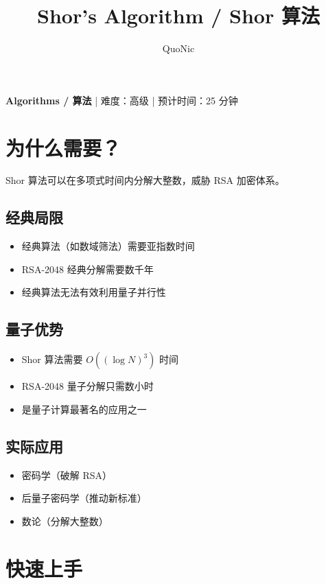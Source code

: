 \documentclass[12pt,a4paper]{article}
\title{Shor's Algorithm / Shor 算法}
\author{QuoNic}
\date{}
\begin{document}
\maketitle

\begin{center}
\textbf{Algorithms / 算法} | 难度：高级 | 预计时间：25 分钟
\end{center}

\tableofcontents
\newpage

\section{为什么需要？}

Shor 算法可以在多项式时间内分解大整数，威胁 RSA 加密体系。

\subsection{经典局限}
\begin{itemize}
  \item 经典算法（如数域筛法）需要亚指数时间
  \item RSA-2048 经典分解需要数千年
  \item 经典算法无法有效利用量子并行性
\end{itemize}

\subsection{量子优势}
\begin{itemize}
  \item Shor 算法需要 $O((\log N)^3)$ 时间
  \item RSA-2048 量子分解只需数小时
  \item 是量子计算最著名的应用之一
\end{itemize}

\subsection{实际应用}
\begin{itemize}
  \item 密码学（破解 RSA）
  \item 后量子密码学（推动新标准）
  \item 数论（分解大整数）
\end{itemize}

\section{快速上手}
\end{document}
